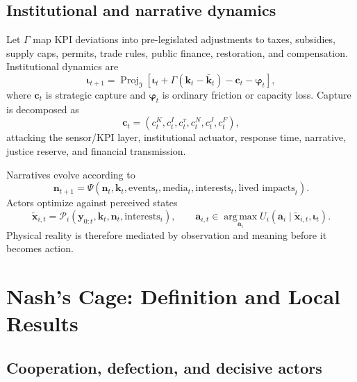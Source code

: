 \documentclass[11pt,a4paper]{article}
\numberwithin{equation}{section}
\theoremstyle{definition}
\theoremstyle{plain}
\theoremstyle{remark}
\newcommand{\argmax}{\operatorname*{arg\,max}}
\newcommand{\Proj}{\operatorname{Proj}}
\newcommand{\state}{\bm{x}}
\newcommand{\kpi}{\bm{k}}
\newcommand{\action}{\bm{a}}
\newcommand{\capture}{\bm{c}}
\newcommand{\inst}{\bm{\iota}}
\newcommand{\narr}{\bm{n}}
\begin{document}
\subsection{Institutional and narrative dynamics}

Let $\Gamma$ map KPI deviations into pre-legislated adjustments to taxes, subsidies, supply caps, permits, trade rules, public finance, restoration, and compensation. Institutional dynamics are
\begin{equation}
\inst_{t+1}=\Proj_{\mathfrak I}\left[
\inst_t+\Gamma(\kpi_t-\bar{\kpi}_t)-\capture_t-\bm{\varphi}_t
\right],
\label{eq:institution}
\end{equation}
where $\capture_t$ is strategic capture and $\bm{\varphi}_t$ is ordinary friction or capacity loss. Capture is decomposed as
\begin{equation}
\capture_t=(c_t^{K},c_t^{I},c_t^{\tau},c_t^{N},c_t^{J},c_t^{F}),
\label{eq:capture}
\end{equation}
attacking the sensor/KPI layer, institutional actuator, response time, narrative, justice reserve, and financial transmission.

Narratives evolve according to
\begin{equation}
\narr_{t+1}=\Psi(\narr_t,\kpi_t,\text{events}_t,\text{media}_t,
\text{interests}_t,\text{lived impacts}_t).
\label{eq:narrative}
\end{equation}
Actors optimize against perceived states
\begin{equation}
  \widetilde{\state}_{i,t}=\mathcal P_i(\bm{y}_{0:t},\kpi_t,\narr_t,\text{interests}_i),
  \qquad
  \action_{i,t}\in\argmax_{\action_i}U_i(\action_i\mid \widetilde{\state}_{i,t},\inst_t).
\label{eq:perception}
\end{equation}
Physical reality is therefore mediated by observation and meaning before it becomes action.

\section{Nash's Cage: Definition and Local Results}

\subsection{Cooperation, defection, and decisive actors}
\end{document}
